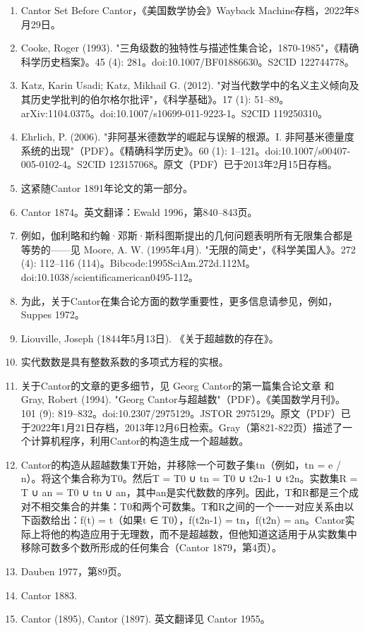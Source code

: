 \begin{enumerate}
\item Cantor Set Before Cantor，《美国数学协会》Wayback Machine存档，2022年8月29日。
\item Cooke, Roger (1993). "三角级数的独特性与描述性集合论，1870-1985"，《精确科学历史档案》。45 (4): 281。doi:10.1007/BF01886630。S2CID 122744778。
\item Katz, Karin Usadi; Katz, Mikhail G. (2012). "对当代数学中的名义主义倾向及其历史学批判的伯尔格尔批评"，《科学基础》。17 (1): 51–89。arXiv:1104.0375。doi:10.1007/s10699-011-9223-1。S2CID 119250310。
\item Ehrlich, P. (2006). "非阿基米德数学的崛起与误解的根源。I. 非阿基米德量度系统的出现"（PDF）。《精确科学历史》。60 (1): 1–121。doi:10.1007/s00407-005-0102-4。S2CID 123157068。原文（PDF）已于2013年2月15日存档。
\item 这紧随Cantor 1891年论文的第一部分。
\item Cantor 1874。英文翻译：Ewald 1996，第840–843页。
\item 例如，伽利略和约翰·邓斯·斯科图斯提出的几何问题表明所有无限集合都是等势的——见 Moore, A. W. (1995年4月). "无限的简史"，《科学美国人》。272 (4): 112–116 (114)。Bibcode:1995SciAm.272d.112M。doi:10.1038/scientificamerican0495-112。
\item 为此，关于Cantor在集合论方面的数学重要性，更多信息请参见，例如，Suppes 1972。
\item Liouville, Joseph (1844年5月13日). 《关于超越数的存在》。
\item 实代数数是具有整数系数的多项式方程的实根。
\item 关于Cantor的文章的更多细节，见 Georg Cantor的第一篇集合论文章 和 Gray, Robert (1994). "Georg Cantor与超越数"（PDF）。《美国数学月刊》。101 (9): 819–832。doi:10.2307/2975129。JSTOR 2975129。原文（PDF）已于2022年1月21日存档，2013年12月6日检索。Gray（第821-822页）描述了一个计算机程序，利用Cantor的构造生成一个超越数。
\item Cantor的构造从超越数集T开始，并移除一个可数子集{tn}（例如，tn = e / n）。将这个集合称为T0。然后T = T0 ∪ {tn} = T0 ∪ {t2n-1} ∪ {t2n}。实数集R = T ∪ {an} = T0 ∪ {tn} ∪ {an}，其中an是实代数数的序列。因此，T和R都是三个成对不相交集合的并集：T0和两个可数集。T和R之间的一个一一对应关系由以下函数给出：f(t) = t（如果t ∈ T0），f(t2n-1) = tn，f(t2n) = an。Cantor实际上将他的构造应用于无理数，而不是超越数，但他知道这适用于从实数集中移除可数多个数所形成的任何集合（Cantor 1879，第4页）。
\item Dauben 1977，第89页。
\item Cantor 1883.
\item Cantor (1895), Cantor (1897). 英文翻译见 Cantor 1955。

\end{enumerate}

